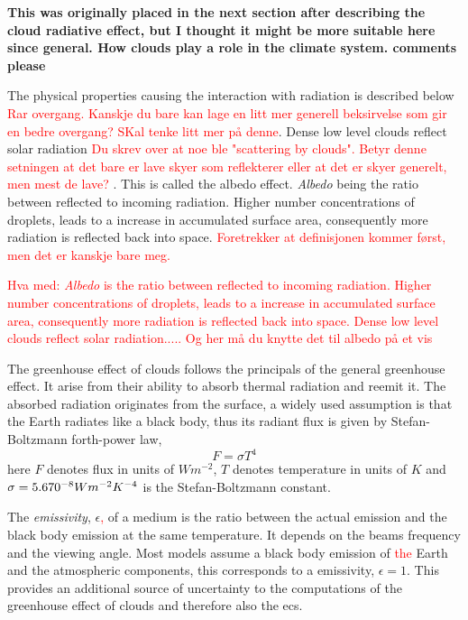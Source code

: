 \textbf{This was originally placed in the next section after describing the cloud radiative effect, but I thought it might be more suitable here since general. How clouds play a role in the climate system. comments please}

The physical properties causing the interaction with radiation is described below \textcolor{red}{Rar overgang. Kanskje du bare kan lage en litt mer generell beksirvelse som gir en bedre overgang? SKal tenke litt mer på denne}. Dense low level clouds reflect solar radiation \textcolor{red}{Du skrev over at noe ble "scattering by clouds". Betyr denne setningen at det bare er lave skyer som reflekterer eller at det er skyer generelt, men mest de lave? }. This is called the albedo effect. \textit{Albedo} being the ratio between reflected to incoming radiation. Higher number concentrations of droplets, leads to a increase in accumulated surface area, consequently more radiation is reflected back into space. \textcolor{red}{Foretrekker at definisjonen kommer først, men det er kanskje bare meg. }

\textcolor{red}{Hva med: \textit{Albedo} is the ratio between reflected to incoming radiation. Higher number concentrations of droplets, leads to a increase in accumulated surface area, consequently more radiation is reflected back into space. Dense low level clouds reflect solar radiation..... Og her må du knytte det til albedo på et vis}

The greenhouse effect of clouds follows the principals of the general greenhouse effect. It arise from their ability to absorb thermal radiation and reemit it. The absorbed radiation originates from the surface, a widely used assumption is that the Earth radiates like a black body, thus its radiant flux is given by Stefan-Boltzmann forth-power law, 
\begin{equation} \label{eq:stefan-boltzmann}
    F = \sigma  T ^4 %
\end{equation}
here $F$ denotes flux in units of $W m^{-2}$, $T$ denotes temperature in units of $K$ and \\  $\sigma = 5.670 \time 10^{-8} W m^{-2} K^{-4}$ is the Stefan-Boltzmann constant. 

The \textit{emissivity}, $\epsilon$\textcolor{red}{,} of a medium is the ratio between the actual emission and the black body emission at the same temperature. It depends on the beams frequency and the viewing angle. Most models assume a black body emission of \textcolor{red}{the} Earth and the atmospheric components, this corresponds to a emissivity, $\epsilon=1$. This provides an additional source of uncertainty to the computations of the greenhouse effect of clouds and therefore also the \acrshort{ecs}.

